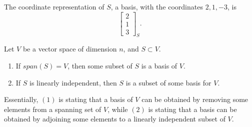 \begin{example}
  The coordinate representation of $S$, a basis, with the coordinates $2, 1, -3$, is 
  \begin{equation*}
    \begin{bmatrix} 2 \\ 1 \\ 3 \end{bmatrix}_{S}.
  \end{equation*}
\end{example}

\begin{theorem}
  Let $V$ be a vector space of dimension $n$, and $S \subset V$.
  \begin{enumerate}[(1)]
    \item If $span(S) = V$, then some subset of $S$ is a basis of $V$.
    \item If $S$ is linearly independent, then $S$ is a subset of some basis for $V$.
  \end{enumerate}
\end{theorem}

Essentially, $(1)$ is stating that a basis of $V$ can be obtained by removing some elements from a spanning set of $V$,
while $(2)$ is stating that a basis can be obtained by adjoining some elements to a linearly independent subset of $V$.





